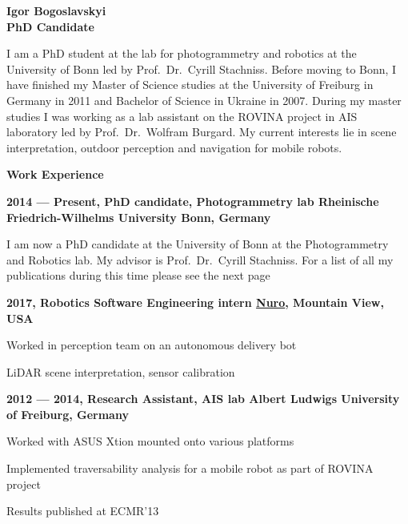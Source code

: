 \documentclass[a4paper,12pt,final]{memoir}
\newcommand{\Sep}{\vspace{1.5em}}
\newcommand{\SmallSep}{\vspace{0.5em}}
\newenvironment{AboutMe}
	{\ignorespaces}
	{\Sep\ignorespacesafterend}
\newcommand{\CVSection}[1]
	{\Large\textbf{#1}\par
	\SmallSep\normalsize\normalfont}
\newcommand{\CVItem}[1]
	{\textbf{\color{MidnightBlue} #1}}
\begin{document}
\framebreak{}


\Huge\bfseries {\color{MidnightBlue} Igor Bogoslavskyi} \\
\Large\bfseries  PhD Candidate \\

\normalsize\normalfont{}

\begin{AboutMe}
I am a PhD student at the lab for photogrammetry and robotics at the University
of Bonn led by Prof.~Dr.~Cyrill Stachniss. Before moving to Bonn, I have
finished my Master of Science studies at the University of Freiburg in Germany
in 2011 and Bachelor of Science in Ukraine in 2007. During my master studies I
was working as a lab assistant on the ROVINA project in AIS laboratory led by
Prof.~Dr.~Wolfram Burgard. My current interests lie in scene interpretation,
outdoor perception and navigation for mobile robots.
\end{AboutMe}

\CVSection{Work Experience}
\CVItem{2014 --- Present, PhD candidate, Photogrammetry lab
\newline Rheinische Friedrich-Wilhelms University Bonn, Germany}
\begin{compactitem}[\color{RoyalBlue}$\circ$]
\item I am now a PhD candidate at the University of Bonn at the Photogrammetry
and Robotics lab. My advisor is Prof.~Dr.~Cyrill Stachniss. For a list of
all my publications during this time please see the next page
\end{compactitem}
\SmallSep

\CVItem{2017, Robotics Software Engineering intern
\newline \href{https://nuro.ai/}{Nuro}, Mountain View, USA}
\begin{compactitem}[\color{MidnightBlue}$\circ$]
\item Worked in perception team on an autonomous delivery bot
\item LiDAR scene interpretation, sensor calibration
\end{compactitem}

\CVItem{2012 --- 2014, Research Assistant, AIS lab
\newline Albert Ludwigs University of Freiburg, Germany}
\begin{compactitem}[\color{RoyalBlue}$\circ$]
\item Worked with ASUS Xtion mounted onto various platforms
\item Implemented traversability analysis for a mobile robot as part of ROVINA
project
\item Results published at ECMR'13
\end{compactitem}
\SmallSep
\end{document}
